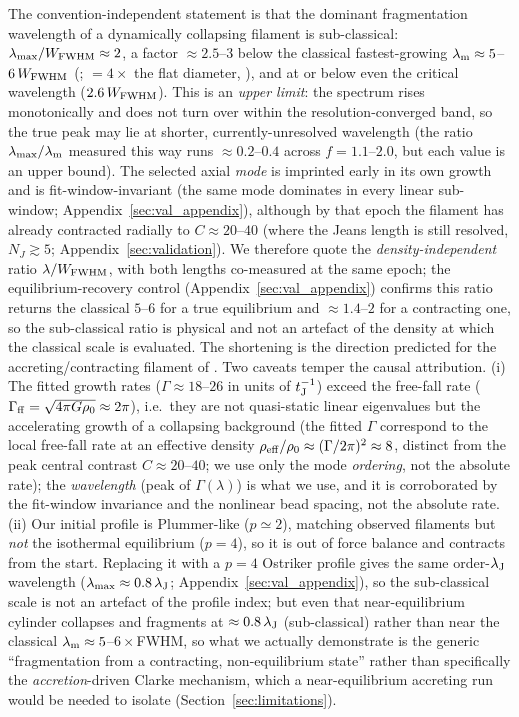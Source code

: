 \documentclass[usenatbib,twoside,twocolumn]{mnras}
\begin{document}
The convention-independent statement is that the dominant fragmentation wavelength of a dynamically collapsing filament is sub-classical: $\lambda_{\rm max}/W_{\rm FWHM}\approx2$, a factor $\approx2.5$--$3$ below the classical fastest-growing $\lambda_{\rm m}\approx5$--$6\,W_{\rm FWHM}$ (\citealt{Fischera2012}; $=4\times$ the flat diameter, \citealt{Inutsuka1992}), and at or below even the critical wavelength ($2.6\,W_{\rm FWHM}$). This is an \emph{upper limit}: the spectrum rises monotonically and does not turn over within the resolution-converged band, so the true peak may lie at shorter, currently-unresolved wavelength (the ratio $\lambda_{\rm max}/\lambda_{\rm m}$ measured this way runs $\approx0.2$--$0.4$ across $f=1.1$--$2.0$, but each value is an upper bound). The selected axial \emph{mode} is imprinted early in its own growth and is fit-window-invariant (the same mode dominates in every linear sub-window; Appendix~\ref{sec:val_appendix}), although by that epoch the filament has already contracted radially to $C\approx20$--$40$ (where the Jeans length is still resolved, $N_J\gtrsim5$; Appendix~\ref{sec:validation}). We therefore quote the \emph{density-independent} ratio $\lambda/W_{\rm FWHM}$, with both lengths co-measured at the same epoch; the equilibrium-recovery control (Appendix~\ref{sec:val_appendix}) confirms this ratio returns the classical $5$--$6$ for a true equilibrium and $\approx1.4$--$2$ for a contracting one, so the sub-classical ratio is physical and not an artefact of the density at which the classical scale is evaluated. The shortening is the direction predicted for the accreting/contracting filament of \citet{Clarke2016,Clarke2017}. Two caveats temper the causal attribution. (i) The fitted growth rates ($\Gamma\approx18$--$26$ in units of $t_{\rm J}^{-1}$) exceed the free-fall rate ($\Gamma_{\rm ff}=\sqrt{4\pi G\rho_0}\approx2\pi$), i.e.\ they are not quasi-static linear eigenvalues but the accelerating growth of a collapsing background (the fitted $\Gamma$ correspond to the local free-fall rate at an effective density $\rho_{\rm eff}/\rho_0\approx(\Gamma/2\pi)^2\approx8$, distinct from the peak central contrast $C\approx20$--$40$; we use only the mode \emph{ordering}, not the absolute rate); the \emph{wavelength} (peak of $\Gamma(\lambda)$) is what we use, and it is corroborated by the fit-window invariance and the nonlinear bead spacing, not the absolute rate. (ii) Our initial profile is Plummer-like ($p\simeq2$), matching observed filaments but \emph{not} the isothermal equilibrium ($p=4$), so it is out of force balance and contracts from the start. Replacing it with a $p=4$ Ostriker profile gives the same order-$\lambda_{\rm J}$ wavelength ($\lambda_{\rm max}\approx0.8\,\lambda_{\rm J}$; Appendix~\ref{sec:val_appendix}), so the sub-classical scale is not an artefact of the profile index; but even that near-equilibrium cylinder collapses and fragments at $\approx0.8\,\lambda_{\rm J}$ (sub-classical) rather than near the classical $\lambda_{\rm m}\approx5$--$6\times$FWHM, so what we actually demonstrate is the generic ``fragmentation from a contracting, non-equilibrium state'' rather than specifically the \emph{accretion}-driven Clarke mechanism, which a near-equilibrium accreting run would be needed to isolate (Section~\ref{sec:limitations}).
\end{document}
